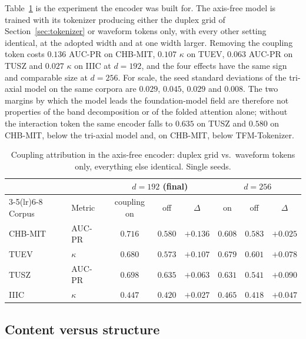 Table~\ref{tab:attribution} is the experiment the encoder was built for.
The axis-free model is trained with its tokenizer producing either the
duplex grid of Section~\ref{sec:tokenizer} or waveform tokens only, with
every other setting identical, at the adopted width and at one width
larger. Removing the coupling token costs $0.136$ AUC-PR on CHB-MIT,
$0.107$ $\kappa$ on TUEV, $0.063$ AUC-PR on TUSZ and $0.027$ $\kappa$ on
IIIC at $d{=}192$, and the four effects have the same sign and comparable
size at $d{=}256$. For scale, the seed standard deviations of the
tri-axial model on the same corpora are $0.029$, $0.045$, $0.029$ and
$0.008$. The two margins by which the model leads the foundation-model
field are therefore not properties of the band decomposition or of the
folded attention alone; without the interaction token the same encoder
falls to $0.635$ on TUSZ and $0.580$ on CHB-MIT, below the tri-axial model
and, on CHB-MIT, below TFM-Tokenizer.

\begin{table}[t]
\centering
\small
\caption{Coupling attribution in the axis-free encoder: duplex grid vs.\
waveform tokens only, everything else identical. Single seeds.}
\label{tab:attribution}
\begin{tabular}{llcccccc}
\toprule
 & & \multicolumn{3}{c}{$d{=}192$ (final)} & \multicolumn{3}{c}{$d{=}256$} \\
\cmidrule(lr){3-5}\cmidrule(lr){6-8}
Corpus & Metric & coupling on & off & $\Delta$ & on & off & $\Delta$ \\
\midrule
CHB-MIT & AUC-PR & $\mathbf{0.716}$ & $0.580$ & $\mathbf{+0.136}$ & $0.608$ & $0.583$ & $+0.025$ \\
TUEV & $\kappa$ & $\mathbf{0.680}$ & $0.573$ & $\mathbf{+0.107}$ & $0.679$ & $0.601$ & $+0.078$ \\
TUSZ & AUC-PR & $\mathbf{0.698}$ & $0.635$ & $\mathbf{+0.063}$ & $0.631$ & $0.541$ & $+0.090$ \\
IIIC & $\kappa$ & $\mathbf{0.447}$ & $0.420$ & $+0.027$ & $0.465$ & $0.418$ & $+0.047$ \\
\bottomrule
\end{tabular}
\end{table}

\subsection{Content versus structure}
\label{sec:content-structure}

